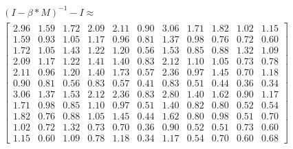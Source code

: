 \begin{gather}
	\nonumber (I - \beta * M)^{-1} - I \approx\\
	 \begin{bmatrix}
		2.96 & 1.59 & 1.72 & 2.09 & 2.11 & 0.90 & 3.06 & 1.71 & 1.82 & 1.02 & 1.15\\
		1.59 & 0.93 & 1.05 & 1.17 & 0.96 & 0.81 & 1.37 & 0.98 & 0.76 & 0.72 & 0.60\\
		1.72 & 1.05 & 1.43 & 1.22 & 1.20 & 0.56 & 1.53 & 0.85 & 0.88 & 1.32 & 1.09\\
		2.09 & 1.17 & 1.22 & 1.41 & 1.40 & 0.83 & 2.12 & 1.10 & 1.05 & 0.73 & 0.78\\
		2.11 & 0.96 & 1.20 & 1.40 & 1.73 & 0.57 & 2.36 & 0.97 & 1.45 & 0.70 & 1.18\\
		0.90 & 0.81 & 0.56 & 0.83 & 0.57 & 0.41 & 0.83 & 0.51 & 0.44 & 0.36 & 0.34\\
		3.06 & 1.37 & 1.53 & 2.12 & 2.36 & 0.83 & 2.80 & 1.40 & 1.62 & 0.90 & 1.17\\
		1.71 & 0.98 & 0.85 & 1.10 & 0.97 & 0.51 & 1.40 & 0.82 & 0.80 & 0.52 & 0.54\\
		1.82 & 0.76 & 0.88 & 1.05 & 1.45 & 0.44 & 1.62 & 0.80 & 0.98 & 0.51 & 0.70\\
		1.02 & 0.72 & 1.32 & 0.73 & 0.70 & 0.36 & 0.90 & 0.52 & 0.51 & 0.73 & 0.60\\
		1.15 & 0.60 & 1.09 & 0.78 & 1.18 & 0.34 & 1.17 & 0.54 & 0.70 & 0.60 & 0.68
	\end{bmatrix}
	\label{frml:katzZentralitaetPseudoMitarbeiter:formel5}
\end{gather}